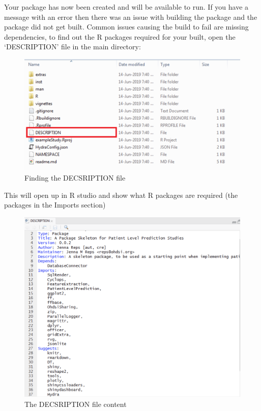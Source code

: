 \documentclass[11pt]{book}
\theoremstyle{definition}
\theoremstyle{definition}
\theoremstyle{definition}
\theoremstyle{remark}
\begin{document}
Your package has now been created and will be available to run. If you have a message with an error then there was an issue with building the package and the package did not get built. Common issues causing the build to fail are missing dependencies, to find out the R packages required for your built, open the `DESCRIPTION' file in the main directory:

\begin{figure}
\includegraphics[width=1\linewidth]{images/PatientLevelPrediction/atlasImplementation/download_folder_desc} \caption{Finding the DECSRIPTION file}\label{fig:figureU15}
\end{figure}

This will open up in R studio and show what R packages are required (the packages in the Imports section)

\begin{figure}
\includegraphics[width=1\linewidth]{images/PatientLevelPrediction/atlasImplementation/description} \caption{The DECSRIPTION file content}\label{fig:figureU16}
\end{figure}
\end{document}

